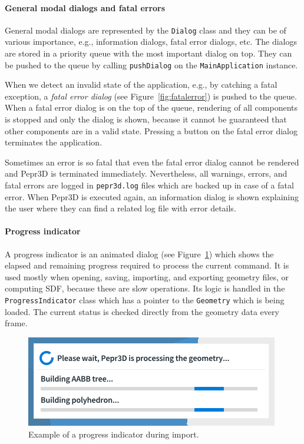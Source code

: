 \paragraph{General modal dialogs and fatal errors}
General modal dialogs are represented by the \texttt{Dialog} class and they can be of various importance, e.g., information dialogs, fatal error dialogs, etc.
The dialogs are stored in a priority queue with the most important dialog on top.
They can be pushed to the queue by calling \texttt{pushDialog} on the \texttt{MainApplication} instance.

When we detect an invalid state of the application, e.g., by catching a fatal exception, a \emph{fatal error dialog} (see Figure~\ref{fig:fatalerror}) is pushed to the queue.
When a fatal error dialog is on the top of the queue, rendering of all components is stopped and only the dialog is shown, because it cannot be guaranteed that other components are in a valid state.
Pressing a button on the fatal error dialog terminates the application.

Sometimes an error is so fatal that even the fatal error dialog cannot be rendered and Pepr3D is terminated immediately.
Nevertheless, all warnings, errors, and fatal errors are logged in \texttt{pepr3d.log} files which are backed up in case of a fatal error.
When Pepr3D is executed again, an information dialog is shown explaining the user where they can find a related log file with error details.

\paragraph{Progress indicator}
A progress indicator is an animated dialog (see Figure~\ref{fig:progressindicator}) which shows the elapsed and remaining progress required to process the current command.
It is used mostly when opening, saving, importing, and exporting geometry files, or computing SDF, because these are slow operations.
Its logic is handled in the \texttt{ProgressIndicator} class which has a pointer to the \texttt{Geometry} which is being loaded.
The current status is checked directly from the geometry data every frame.

\begin{figure}[h]
	\centering
	\centerline{\includegraphics[scale=1.0]{images/progress_indicator.png}}
	\caption{Example of a progress indicator during import.}
	\label{fig:progressindicator}
\end{figure}

